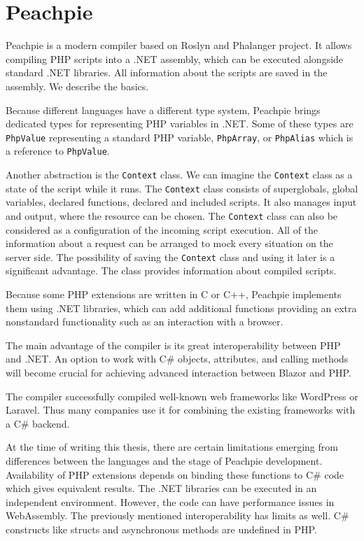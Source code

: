 \section{Peachpie}

Peachpie \cite{online:peachpie} is a modern compiler based on Roslyn and Phalanger project.
It allows compiling PHP scripts into a .NET assembly, which can be executed alongside standard .NET libraries.
All information about the scripts are saved in the assembly.
We describe the basics.
\par
Because different languages have a different type system, Peachpie brings dedicated types for representing PHP variables in .NET.
Some of these types are \texttt{PhpValue} representing a standard PHP variable, \texttt{PhpArray}, or \texttt{PhpAlias} which is a reference to \texttt{PhpValue}.
\par
Another abstraction is the \texttt{Context} class.
We can imagine the \texttt{Context} class as a state of the script while it runs.
The \texttt{Context} class consists of superglobals, global variables, declared functions, declared and included scripts.
It also manages input and output, where the resource can be chosen.
The \texttt{Context} class can also be considered as a configuration of the incoming script execution.
All of the information about a request can be arranged to mock every situation on the server side.
The possibility of saving the \texttt{Context} class and using it later is a significant advantage.
The class provides information about compiled scripts.
\par
Because some PHP extensions are written in C or C++, Peachpie implements them using .NET libraries, which can add additional functions providing an extra nonstandard functionality such as an interaction with a browser.
\par
The main advantage of the compiler is its great interoperability between PHP and .NET.
An option to work with C\# objects, attributes, and calling methods will become crucial for achieving advanced interaction between Blazor and PHP.
\par
The compiler successfully compiled well-known web frameworks like WordPress or Laravel.
Thus many companies use it for combining the existing frameworks with a C\# backend.
\par
At the time of writing this thesis, there are certain limitations emerging from differences between the languages and the stage of Peachpie development.
Availability of PHP extensions depends on binding these functions to C\# code which gives equivalent results. 
The .NET libraries can be executed in an independent environment. 
However, the code can have performance issues in WebAssembly.
The previously mentioned interoperability has limits as well.
C\# constructs like structs and asynchronous methods are undefined in PHP.
